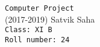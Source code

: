 \newfontfamily{}
\newfontfamily{}

\thispagestyle{empty}\addtocounter{page}{-1}
\hspace{0pt}
\begin{center}
\vfill
{\fontsize{36}{28}\tt Computer Project}\\
\vspace{1mm}
{\Perfograma (2017-2019)}
\vfill
{\fontsize{30}{24}\JennaSue Satvik Saha}\\
\vspace{1mm}
{\tt Class: XI B}\\
{\tt Roll number: 24}
\end{center}
\hspace{0pt}